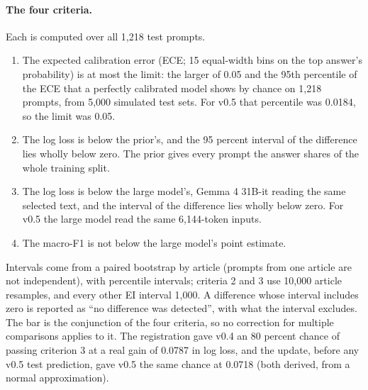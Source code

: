 \documentclass[11pt,letterpaper]{article}
\begin{document}
\paragraph{The four criteria.} Each is computed over all 1,218 test prompts.
\begin{enumerate}\setlength{\itemsep}{1pt}
\item The expected calibration error (ECE; 15 equal-width bins on the top answer's probability) is at most the limit: the larger of 0.05 and the 95th percentile of the ECE that a perfectly calibrated model shows by chance on 1,218 prompts, from 5,000 simulated test sets. For v0.5 that percentile was 0.0184, so the limit was 0.05.
\item The log loss is below the prior's, and the 95 percent interval of the difference lies wholly below zero. The prior gives every prompt the answer shares of the whole training split.
\item The log loss is below the large model's, Gemma 4 31B-it reading the same selected text, and the interval of the difference lies wholly below zero. For v0.5 the large model read the same 6,144-token inputs.
\item The macro-F1 is not below the large model's point estimate.
\end{enumerate}
Intervals come from a paired bootstrap by article (prompts from one article are not independent), with percentile intervals; criteria 2 and 3 use 10,000 article resamples, and every other EI interval 1,000. A difference whose interval includes zero is reported as ``no difference was detected'', with what the interval excludes. The bar is the conjunction of the four criteria, so no correction for multiple comparisons applies to it. The registration gave v0.4 an 80 percent chance of passing criterion 3 at a real gain of 0.0787 in log loss, and the update, before any v0.5 test prediction, gave v0.5 the same chance at 0.0718 (both derived, from a normal approximation).
\end{document}

